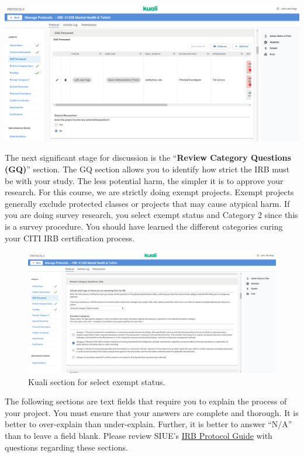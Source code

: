 \documentclass[
]{book}
\begin{document}
\href{https://siue.kuali.co/protocols/portal/protocols}{\includegraphics[width=1\linewidth,height=\textheight,keepaspectratio]{images/siue-personnel.png}}

The next significant stage for discussion is the ``\textbf{Review Category Questions (GQ)}'' section. The GQ section allows you to identify how strict the IRB must be with your study. The less potential harm, the simpler it is to approve your research. For this course, we are strictly doing exempt projects. Exempt projects generally exclude protected classes or projects that may cause atypical harm. If you are doing survey research, you select exempt status and Category 2 since this is a survey procedure. You should have learned the different categories curing your CITI IRB certification process.

\begin{figure}
\centering
\includegraphics[width=1\linewidth,height=\textheight,keepaspectratio]{images/kuali-exempt.png}
\caption{Kuali section for select exempt status.}
\end{figure}

The following sections are text fields that require you to explain the process of your project. You must ensure that your answers are complete and thorough. It is better to over-explain than under-explain. Further, it is better to answer ``N/A'' than to leave a field blank. Please review SIUE's \href{https://www.siue.edu/compliance/human-subjects/pdf/IRBProtocolGuidance.pdf}{IRB Protocol Guide} with questions regarding these sections.
\end{document}
